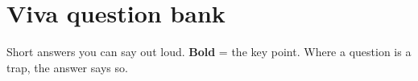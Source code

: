 \newpage
\section{Viva question bank}
{\small Short answers you can say out loud. \textbf{Bold} = the key point. Where a question is a trap, the answer says so.}

\newcommand{\qa}[2]{\par{\raggedright\bfseries Q.\ #1\par}\nopagebreak #2\par\vspace{3pt}}
\newcommand{\qgroup}[1]{\vspace{2pt}{\normalsize\bfseries\color{acc}#1}\par\vspace{1pt}}

